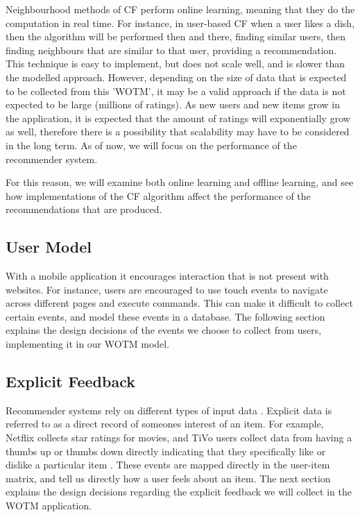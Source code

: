 Neighbourhood methods of CF perform online learning, meaning that they do the computation in real time. For instance, in user-based CF when a user likes a dish, then the algorithm will be performed then and there, finding similar users, then finding neighbours that are similar to that user, providing a recommendation. This technique is easy to implement, but does not scale well, and is slower than the modelled approach. However, depending on the size of data that is expected to be collected from this 'WOTM', it may be a valid approach if the data is not expected to be large (millions of ratings). As new users and new items grow in the application, it is expected that the amount of ratings will exponentially grow as well, therefore there is a possibility that scalability may have to be considered in the long term. As of now, we will focus on the performance of the recommender system.  

For this reason, we will examine both online learning and offline learning, and see how implementations of the CF algorithm affect the performance of the recommendations that are produced.  


\subsection{User Model}

With a mobile application it encourages interaction that is not present with websites. For instance, users are encouraged to use touch events to navigate across different pages and execute commands. This can make it difficult to collect certain events, and model these events in a database. The following section explains the design decisions of the events we choose to collect from users, implementing it in our WOTM model. 

\subsection{Explicit Feedback}

Recommender systems rely on different types of input data \cite{koren2009matrix}. Explicit data is referred to as a direct record of someones interest of an item. For example, Netflix collects star ratings for movies, and TiVo users collect data from having a thumbs up or thumbs down directly indicating that they specifically like or dislike a particular item \cite{koren2009matrix}. These events are mapped directly in the user-item matrix, and tell us directly how a user feels about an item. 
The next section explains the design decisions regarding the explicit feedback we will collect in the WOTM application.

